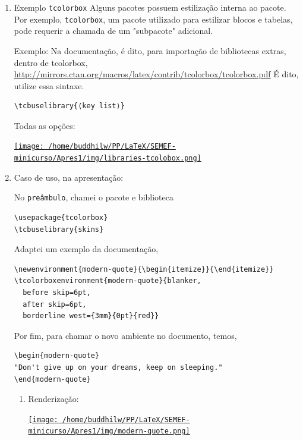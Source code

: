 \documentclass[11pt]{article}
\begin{document}
\begin{enumerate}
\item Exemplo \texttt{tcolorbox}
\label{sec:orgebd9e0f}
Alguns pacotes possuem estilização interna ao pacote. Por exemplo,
\texttt{tcolorbox}, um pacote utilizado para estilizar blocos e tabelas, pode
requerir a chamada de um "subpacote" adicional.

Exemplo:
Na documentação, é dito, para importação de bibliotecas extras, dentro
de tcolorbox,
\url{http://mirrors.ctan.org/macros/latex/contrib/tcolorbox/tcolorbox.pdf}
É dito, utilize essa sintaxe.

\begin{verbatim}
\tcbuselibrary{⟨key list⟩}
\end{verbatim}

Todas as opções:

\href{img/libraries-tcolobox.png}{\texttt{[image: /home/buddhilw/PP/LaTeX/SEMEF-minicurso/Apres1/img/libraries-tcolobox.png]}}

\item Caso de uso, na apresentação:
\label{sec:org358e6a0}

No \texttt{preâmbulo}, chamei o pacote e biblioteca
\begin{verbatim}
\usepackage{tcolorbox}
\tcbuselibrary{skins}
\end{verbatim}

Adaptei um exemplo da documentação,
\begin{verbatim}
\newenvironment{modern-quote}{\begin{itemize}}{\end{itemize}}
\tcolorboxenvironment{modern-quote}{blanker,
  before skip=6pt,
  after skip=6pt,
  borderline west={3mm}{0pt}{red}}
\end{verbatim}

Por fim, para chamar o novo ambiente no documento, temos,
\begin{verbatim}
\begin{modern-quote}
"Don't give up on your dreams, keep on sleeping."
\end{modern-quote}
\end{verbatim}

\begin{enumerate}
\item Renderização:
\label{sec:org7580c26}

\href{img/modern-quote.png}{\texttt{[image: /home/buddhilw/PP/LaTeX/SEMEF-minicurso/Apres1/img/modern-quote.png]}}
\end{enumerate}
\end{enumerate}
\end{document}
